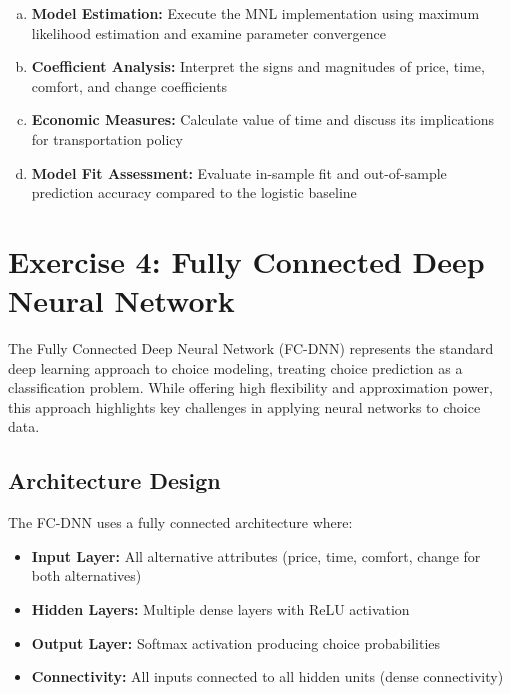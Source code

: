 \documentclass[11pt]{article}
\begin{document}
\begin{enumerate}[(a)]
\item \textbf{Model Estimation:} Execute the MNL implementation using maximum likelihood estimation and examine parameter convergence
\item \textbf{Coefficient Analysis:} Interpret the signs and magnitudes of price, time, comfort, and change coefficients
\item \textbf{Economic Measures:} Calculate value of time and discuss its implications for transportation policy
\item \textbf{Model Fit Assessment:} Evaluate in-sample fit and out-of-sample prediction accuracy compared to the logistic baseline
\end{enumerate}

\section*{Exercise 4: Fully Connected Deep Neural Network}

\begin{center}
\end{center}

The Fully Connected Deep Neural Network (FC-DNN) represents the standard deep learning approach to choice modeling, treating choice prediction as a classification problem. While offering high flexibility and approximation power, this approach highlights key challenges in applying neural networks to choice data.

\subsection*{Architecture Design}

The FC-DNN uses a fully connected architecture where:
\begin{itemize}
\item \textbf{Input Layer:} All alternative attributes (price, time, comfort, change for both alternatives)
\item \textbf{Hidden Layers:} Multiple dense layers with ReLU activation
\item \textbf{Output Layer:} Softmax activation producing choice probabilities
\item \textbf{Connectivity:} All inputs connected to all hidden units (dense connectivity)
\end{itemize}
\end{document}
